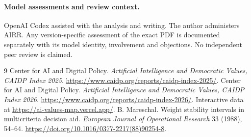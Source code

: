 \documentclass[11pt]{article}
\begin{document}
\paragraph{Model assessments and review context.} OpenAI Codex assisted with the analysis and writing. The author administers AIRR. Any version-specific assessment of the exact PDF is documented separately with its model identity, involvement and objections. No independent peer review is claimed.

\begin{thebibliography}{9}
 Center for AI and Digital Policy. \emph{Artificial Intelligence and Democratic Values, CAIDP Index 2025}. \url{https://www.caidp.org/reports/caidp-index-2025/}.
 Center for AI and Digital Policy. \emph{Artificial Intelligence and Democratic Values, CAIDP Index 2026}. \url{https://www.caidp.org/reports/caidp-index-2026/}. Interactive data at \url{https://ai-values-map.vercel.app/}.
 B. Mareschal. Weight stability intervals in multicriteria decision aid. \emph{European Journal of Operational Research} 33 (1988), 54--64. \url{https://doi.org/10.1016/0377-2217(88)90254-8}.
\end{thebibliography}
\end{document}
